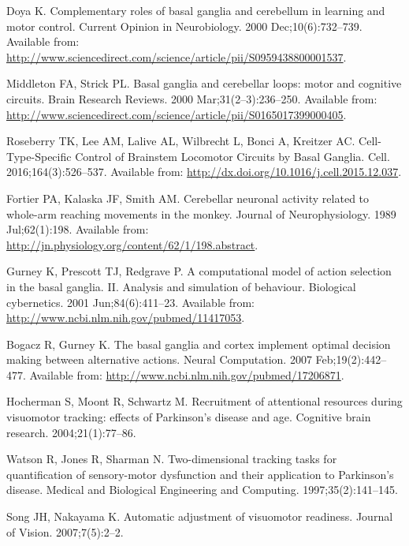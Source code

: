 \documentclass[10pt,letterpaper]{article}
\begin{document}
\begin{thebibliography}{10}
Doya K.
\newblock Complementary roles of basal ganglia and cerebellum in learning and
  motor control.
\newblock Current Opinion in Neurobiology. 2000 Dec;10(6):732--739.
\newblock Available from:
  \url{http://www.sciencedirect.com/science/article/pii/S0959438800001537}.

Middleton FA, Strick PL.
\newblock Basal ganglia and cerebellar loops: motor and cognitive circuits.
\newblock Brain Research Reviews. 2000 Mar;31(2–3):236--250.
\newblock Available from:
  \url{http://www.sciencedirect.com/science/article/pii/S0165017399000405}.

Roseberry TK, Lee AM, Lalive AL, Wilbrecht L, Bonci A, Kreitzer AC.
\newblock Cell-{Type}-{Specific} {Control} of {Brainstem} {Locomotor}
  {Circuits} by {Basal} {Ganglia}.
\newblock Cell. 2016;164(3):526--537.
\newblock Available from: \url{http://dx.doi.org/10.1016/j.cell.2015.12.037}.

Fortier PA, Kalaska JF, Smith AM.
\newblock Cerebellar neuronal activity related to whole-arm reaching movements
  in the monkey.
\newblock Journal of Neurophysiology. 1989 Jul;62(1):198.
\newblock Available from:
  \url{http://jn.physiology.org/content/62/1/198.abstract}.

Gurney K, Prescott TJ, Redgrave P.
\newblock A computational model of action selection in the basal ganglia. {II}.
  {Analysis} and simulation of behaviour.
\newblock Biological cybernetics. 2001 Jun;84(6):411--23.
\newblock Available from: \url{http://www.ncbi.nlm.nih.gov/pubmed/11417053}.

Bogacz R, Gurney K.
\newblock The basal ganglia and cortex implement optimal decision making
  between alternative actions.
\newblock Neural Computation. 2007 Feb;19(2):442--477.
\newblock Available from: \url{http://www.ncbi.nlm.nih.gov/pubmed/17206871}.

Hocherman S, Moont R, Schwartz M.
\newblock Recruitment of attentional resources during visuomotor tracking:
  effects of {Parkinson}'s disease and age.
\newblock Cognitive brain research. 2004;21(1):77--86.

Watson R, Jones R, Sharman N.
\newblock Two-dimensional tracking tasks for quantification of sensory-motor
  dysfunction and their application to {Parkinson}'s disease.
\newblock Medical and Biological Engineering and Computing.
  1997;35(2):141--145.

Song JH, Nakayama K.
\newblock Automatic adjustment of visuomotor readiness.
\newblock Journal of Vision. 2007;7(5):2--2.

\end{thebibliography}

%
%
\end{document}
